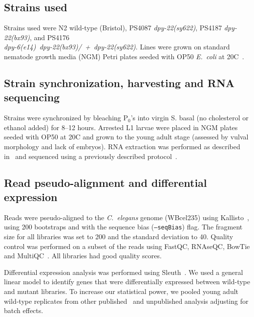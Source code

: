 \documentclass[8pt, twocolumn]{article}
\newcommand{\cel}{\emph{C.~elegans}}
\newcommand{\ecol}{\emph{E.~coli}}
\newcommand{\gene}[1]{\mbox{\emph{#1}}}
\newcommand{\dpy}[1]{\gene{dpy-22#1}}
\newcommand{\bx}{\dpy{(bx93)}}
\newcommand{\sy}{\dpy{(sy622)}}
\begin{document}
\subsection*{Strains used}
Strains used were N2 wild-type (Bristol),
PS4087 \sy{},
PS4187 \bx{},
and PS4176\\ \gene{dpy-6(e14) dpy-22(bx93)/ + dpy-22(sy622)}.
Lines were grown on standard nematode growth media (NGM) Petri plates seeded
with OP50 \ecol{} at 20\degree{}C~\cite{Brenner1974}.

\subsection*{Strain synchronization, harvesting and RNA sequencing}
Strains were synchronized by bleaching P$_0$'s into virgin S. basal (no
cholesterol or ethanol added) for 8--12 hours. Arrested L1 larvae were placed in
NGM plates seeded with OP50 at 20\degree{}C and grown to the young adult stage
(assessed by vulval morphology and lack of embryos). RNA extraction was
performed as described in~\cite{AngelesAlboresHIF} and sequenced using a
previously described protocol~\cite{Angeles-Albores2017}.

\subsection*{Read pseudo-alignment and differential expression}
Reads were pseudo-aligned to the \cel{} genome (WBcel235) using
Kallisto~\cite{Bray2016}, using 200 bootstraps and with the sequence bias
(\texttt{--seqBias}) flag. The fragment size for all libraries was set to 200
and the standard deviation to 40. Quality control was performed on a subset of
the reads using FastQC, RNAseQC, BowTie and
MultiQC~\cite{Andrews2010,Deluca2012,Langmead2009,Ewels2016}. All libraries had
good quality scores.

Differential expression analysis was performed using
Sleuth~\cite{Pimentel2016a}. We used a general linear model to identify genes
that were differentially expressed between wild-type and mutant libraries. To
increase our statistical power, we pooled young adult wild-type replicates from
other published~\cite{AngelesAlboresHIF,Angeles-Albores2017} and unpublished
analysis adjusting for batch effects.
\end{document}
